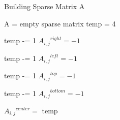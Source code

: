 \begin{algorithm}
\caption{Building Sparse Matrix A}
\begin{algorithmic}
\STATE A = empty sparse matrix
\STATE temp = 4

\STATE temp -= 1
\STATE ${A_{i,j}}^{right} = -1$
\ENDIF

\STATE temp -= 1
\STATE ${A_{i,j}}^{left} = -1$
\ENDIF

\STATE temp -= 1
\STATE ${A_{i,j}}^{top} = -1$
\ENDIF

\STATE temp -= 1
\STATE ${A_{i,j}}^{bottom} = -1$
\ENDIF

\STATE ${A_{i,j}}^{center} = $ temp

\ENDIF
\ENDFOR
\ENDFOR
\end{algorithmic}
\label{buildA}
\end{algorithm}
